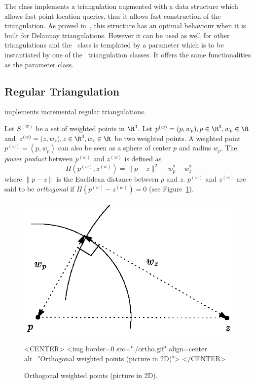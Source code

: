 The class  implements a
triangulation augmented with a data structure which allows fast point
location queries, thus it allows fast construction of the
triangulation. As proved in~\cite{d-iirdt-98}, this structure has an
optimal behaviour when it is built for Delaunay triangulations.
However it can be used as well for other triangulations and the
\ccRefName\ class is templated by a parameter which is to be
instantiated by one of the \cgal\ triangulation classes.  It offers
the same functionalities as the  parameter class.

\subsection{Regular Triangulation} 
\label{Triangulation3-sec-class-Regulartriangulation}

implements incremental regular triangulations.

Let ${S}^{(w)}$ be a set of weighted points in $\R^3$. Let
${p}^{(w)}=(p,w_p), p\in\R^3, w_p\in\R$ and 
${z}^{(w)}=(z,w_z), z\in\R^3, w_z\in\R$ be two weighted points. 
A weighted point
${p}^{(w)}=(p,w_p)$ can also be seen as a sphere of center $p$ and
radius $w_p$. 
The \textit{power product} between ${p}^{(w)}$ and ${z}^{(w)}$ is
defined as 
\[\Pi({p}^{(w)},{z}^{(w)}) = {\|{p-z}\|^2-w_p^2-w_z^2}\]
where $\|{p-z}\|$ is the Euclidean distance between $p$ and $z$. 
 ${p}^{(w)}$ and ${z}^{(w)}$
are said to be \textit{orthogonal} if $\Pi{({p}^{(w)}-{z}^{(w)})}
= 0$ (see Figure~\ref{Triangulation3-fig-ortho}).

\begin{figure}[htbp]
\begin{ccTexOnly}
\begin{center} 
\includegraphics{ortho.eps} 
\end{center}
\end{ccTexOnly}
\caption{Orthogonal weighted points (picture in 2D).
\label{Triangulation3-fig-ortho}}
\begin{ccHtmlOnly}
<CENTER>
<img border=0 src="./ortho.gif" align=center alt="Orthogonal weighted
points (picture in 2D)"> 
</CENTER>
\end{ccHtmlOnly}
\end{figure} 

